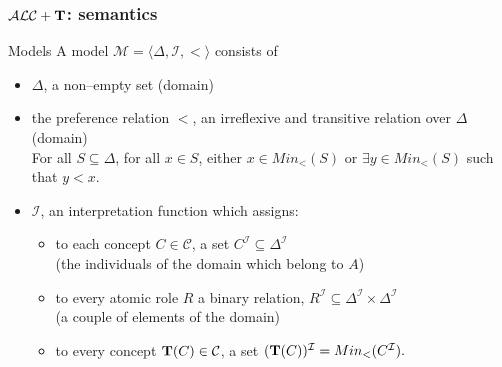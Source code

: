 \documentclass[serif,mathserif]{beamer}
\newcommand{\tip}{{\bf T}}
\newcommand{\alct}{\mathcal{ALC}+\tip}
\begin{document}
\begin{frame}
	\frametitle{$\alct$: semantics}
	\begin{block}{Models}
	A model $\mathcal{M} = \langle \Delta, \mathcal{I}, < \rangle$ consists of
	\begin{itemize}
	\item $\Delta$, a non--empty set (domain)
	\item the preference relation $<$, an irreflexive and transitive relation over $\Delta$ (domain)\\
	\footnotesize
	For all $S\subseteq \Delta$, for all $x \in S$, either $x \in Min_<(S)$ or $\exists y \in  Min_<(S)$ such that $y < x$.
	\normalsize
	\item $\mathcal{I}$, an interpretation function which assigns:
		\begin{itemize}
		\item to each concept $C \in \mathcal{C}$, a set $C^{\mathcal{I}} \subseteq \Delta^{\mathcal{I}}$\\
		(the individuals of the domain which belong to $A$)
		\item to every atomic role $R$ a binary relation, $R^{\mathcal{I}} \subseteq \Delta^{\mathcal{I}} \times \Delta^{\mathcal{I}}$\\
		(a couple of elements of the domain)
		\item \alert{to every concept $\tip(C) \in \mathcal{C}$, a set $(\tip(C))^\mathcal{I} = Min_<(C^\mathcal{I}).$}
		\end{itemize}
	\end{itemize}
	\end{block}
\end{frame}
\end{document}

